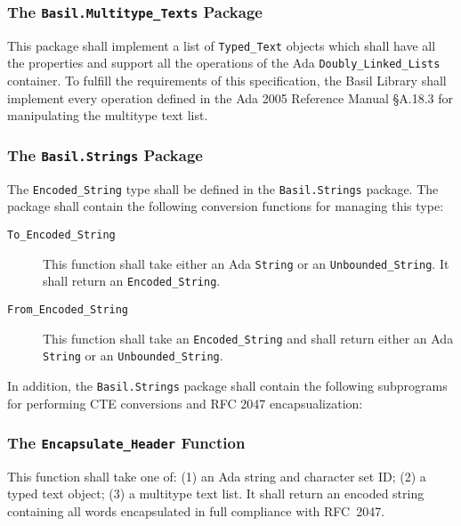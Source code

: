 \documentclass[11pt]{article}
\begin{document}
\subsubsection{The \texttt{Basil.Multitype\_Texts} Package}
\label{sr:multitype-texts}

This package shall implement a list of \texttt{Typed\_Text} objects
which shall have all the properties and support all the operations of
the Ada \texttt{Doubly\_Linked\_Lists} container. To fulfill the
requirements of this specification, the Basil Library shall implement
every operation defined in the Ada 2005 Reference Manual \S{}A.18.3
for manipulating the multitype text list.

\subsubsection{The \texttt{Basil.Strings} Package}

The \texttt{Encoded\_String} type shall be defined in the
\texttt{Basil.Strings} package. The package shall contain the
following conversion functions for managing this type:

\begin{description}

\item[\texttt{To\_Encoded\_String}] This function shall take either an
  Ada \texttt{String} or an \texttt{Unboun\-ded\_String}. It shall return
  an \texttt{Encoded\_String}.

\item[\texttt{From\_Encoded\_String}] This function shall take an
  \texttt{Encoded\_String} and shall return either an Ada
  \texttt{String} or an \texttt{Unbounded\_String}.

\end{description}

In addition, the \texttt{Basil.Strings} package shall contain the
following subprograms for performing CTE conversions and RFC 2047
encapsualization:

\subsubsection{The \texttt{Encapsulate\_Header} Function}

This function shall take one of: (1) an Ada string and character set
ID; (2) a typed text object; (3) a multitype text list. It shall return
an encoded string containing all words encapsulated in full compliance
with RFC~2047.
\end{document}
